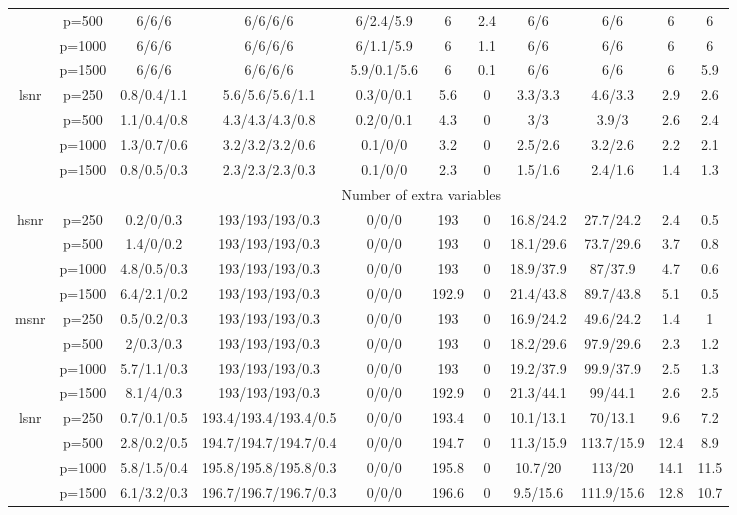 \begin{table}[ht]
{\begin{tabular}{|c|c|ccccccccc|}
   & p=500 & 6/6/6 & 6/6/6/6 & 6/2.4/5.9 & 6 & 2.4 & 6/6 & 6/6 & 6 & 6 \\ 
   & p=1000 & 6/6/6 & 6/6/6/6 & 6/1.1/5.9 & 6 & 1.1 & 6/6 & 6/6 & 6 & 6 \\ 
   & p=1500 & 6/6/6 & 6/6/6/6 & 5.9/0.1/5.6 & 6 & 0.1 & 6/6 & 6/6 & 6 & 5.9 \\ 
  \midrule\multirow{4}[2]{*}{lsnr} & p=250 & 0.8/0.4/1.1 & 5.6/5.6/5.6/1.1 & 0.3/0/0.1 & 5.6 & 0 & 3.3/3.3 & 4.6/3.3 & 2.9 & 2.6 \\ 
   & p=500 & 1.1/0.4/0.8 & 4.3/4.3/4.3/0.8 & 0.2/0/0.1 & 4.3 & 0 & 3/3 & 3.9/3 & 2.6 & 2.4 \\ 
   & p=1000 & 1.3/0.7/0.6 & 3.2/3.2/3.2/0.6 & 0.1/0/0 & 3.2 & 0 & 2.5/2.6 & 3.2/2.6 & 2.2 & 2.1 \\ 
   & p=1500 & 0.8/0.5/0.3 & 2.3/2.3/2.3/0.3 & 0.1/0/0 & 2.3 & 0 & 1.5/1.6 & 2.4/1.6 & 1.4 & 1.3 \\ 
   \midrule 
 \multicolumn{1}{|c}{} &       & \multicolumn{9}{c|}{Number of extra variables} \\
\midrule\multirow{4}[2]{*}{hsnr} & p=250 & 0.2/0/0.3 & 193/193/193/0.3 & 0/0/0 & 193 & 0 & 16.8/24.2 & 27.7/24.2 & 2.4 & 0.5 \\ 
   & p=500 & 1.4/0/0.2 & 193/193/193/0.3 & 0/0/0 & 193 & 0 & 18.1/29.6 & 73.7/29.6 & 3.7 & 0.8 \\ 
   & p=1000 & 4.8/0.5/0.3 & 193/193/193/0.3 & 0/0/0 & 193 & 0 & 18.9/37.9 & 87/37.9 & 4.7 & 0.6 \\ 
   & p=1500 & 6.4/2.1/0.2 & 193/193/193/0.3 & 0/0/0 & 192.9 & 0 & 21.4/43.8 & 89.7/43.8 & 5.1 & 0.5 \\ 
  \midrule\multirow{4}[2]{*}{msnr} & p=250 & 0.5/0.2/0.3 & 193/193/193/0.3 & 0/0/0 & 193 & 0 & 16.9/24.2 & 49.6/24.2 & 1.4 & 1 \\ 
   & p=500 & 2/0.3/0.3 & 193/193/193/0.3 & 0/0/0 & 193 & 0 & 18.2/29.6 & 97.9/29.6 & 2.3 & 1.2 \\ 
   & p=1000 & 5.7/1.1/0.3 & 193/193/193/0.3 & 0/0/0 & 193 & 0 & 19.2/37.9 & 99.9/37.9 & 2.5 & 1.3 \\ 
   & p=1500 & 8.1/4/0.3 & 193/193/193/0.3 & 0/0/0 & 192.9 & 0 & 21.3/44.1 & 99/44.1 & 2.6 & 2.5 \\ 
  \midrule\multirow{4}[2]{*}{lsnr} & p=250 & 0.7/0.1/0.5 & 193.4/193.4/193.4/0.5 & 0/0/0 & 193.4 & 0 & 10.1/13.1 & 70/13.1 & 9.6 & 7.2 \\ 
   & p=500 & 2.8/0.2/0.5 & 194.7/194.7/194.7/0.4 & 0/0/0 & 194.7 & 0 & 11.3/15.9 & 113.7/15.9 & 12.4 & 8.9 \\ 
   & p=1000 & 5.8/1.5/0.4 & 195.8/195.8/195.8/0.3 & 0/0/0 & 195.8 & 0 & 10.7/20 & 113/20 & 14.1 & 11.5 \\ 
   & p=1500 & 6.1/3.2/0.3 & 196.7/196.7/196.7/0.3 & 0/0/0 & 196.6 & 0 & 9.5/15.6 & 111.9/15.6 & 12.8 & 10.7 \\ 
   \bottomrule 
\end{tabular}
}
\end{table}
